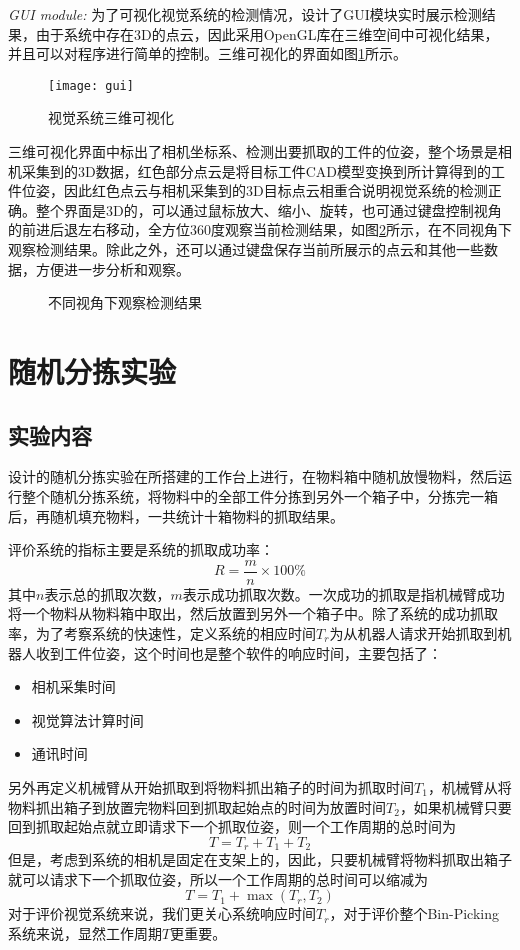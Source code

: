 \emph{GUI module:}
为了可视化视觉系统的检测情况，设计了GUI模块实时展示检测结果，由于系统中存在3D的点云，因此采用OpenGL库在三维空间中可视化结果，并且可以对程序进行简单的控制。三维可视化的界面如图\ref{fig:gui}所示。
\begin{figure}[ht]
  \centering
  \texttt{[image: gui]}
  \caption{视觉系统三维可视化}
  \label{fig:gui}
\end{figure}
三维可视化界面中标出了相机坐标系、检测出要抓取的工件的位姿，整个场景是相机采集到的3D数据，红色部分点云是将目标工件CAD模型变换到所计算得到的工件位姿，因此红色点云与相机采集到的3D目标点云相重合说明视觉系统的检测正确。整个界面是3D的，可以通过鼠标放大、缩小、旋转，也可通过键盘控制视角的前进后退左右移动，全方位360度观察当前检测结果，如图\ref{fig:view-pose}所示，在不同视角下观察检测结果。除此之外，还可以通过键盘保存当前所展示的点云和其他一些数据，方便进一步分析和观察。
\begin{figure}[ht]
  \centering
  \hfill
  \caption{不同视角下观察检测结果}
  \label{fig:view-pose}
\end{figure}

\section{随机分拣实验}
\subsection{实验内容}
设计的随机分拣实验在所搭建的工作台上进行，在物料箱中随机放慢物料，然后运行整个随机分拣系统，将物料中的全部工件分拣到另外一个箱子中，分拣完一箱后，再随机填充物料，一共统计十箱物料的抓取结果。

评价系统的指标主要是系统的抓取成功率：
\begin{equation}
  R = \frac{m}{n}\times 100\%
\end{equation}
其中$n$表示总的抓取次数，$m$表示成功抓取次数。一次成功的抓取是指机械臂成功将一个物料从物料箱中取出，然后放置到另外一个箱子中。除了系统的成功抓取率，为了考察系统的快速性，定义系统的相应时间$T_r$为从机器人请求开始抓取到机器人收到工件位姿，这个时间也是整个软件的响应时间，主要包括了：
\begin{itemize}
\item 相机采集时间
\item 视觉算法计算时间
\item 通讯时间
\end{itemize}
另外再定义机械臂从开始抓取到将物料抓出箱子的时间为抓取时间$T_1$，机械臂从将物料抓出箱子到放置完物料回到抓取起始点的时间为放置时间$T_2$，如果机械臂只要回到抓取起始点就立即请求下一个抓取位姿，则一个工作周期的总时间为
\begin{equation}
  T = T_r + T_1 + T_2
\end{equation}
但是，考虑到系统的相机是固定在支架上的，因此，只要机械臂将物料抓取出箱子就可以请求下一个抓取位姿，所以一个工作周期的总时间可以缩减为
\begin{equation}
  T = T_1 + \max(T_r,T_2)
\end{equation}
对于评价视觉系统来说，我们更关心系统响应时间$T_r$，对于评价整个Bin-Picking系统来说，显然工作周期$T$更重要。
